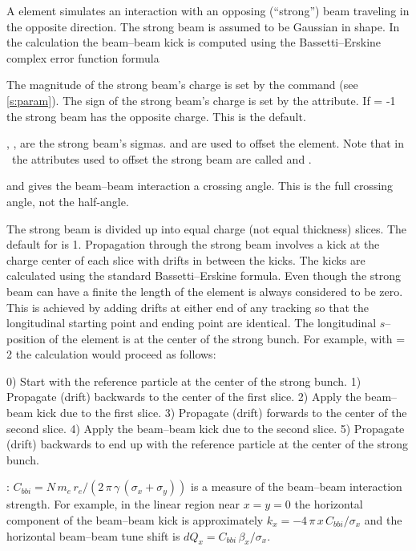 A  element simulates an interaction with an opposing
(``strong'') beam traveling in the opposite direction. The strong beam
is assumed to be Gaussian in shape. In the 
calculation the beam--beam kick is computed using the
Bassetti--Erskine complex error function formula\cite{b:talman}

The magnitude of the strong beam's charge is set by the 
command (see \ref{s:param}).  The sign of the strong beam's charge is
set by the  attribute. If  = -1 the
strong beam has the opposite charge. This is the default.

, ,  are the strong beam's sigmas. 
 and  are used to offset the
 element. Note that in \mad\ the attributes used to
offset the strong beam are called  and .

 and  gives the beam--beam interaction a
crossing angle. This is the full crossing angle, not the half-angle.

The strong beam is divided up into  equal charge (not equal
thickness) slices. The default for  is 1. Propagation
through the strong beam involves a kick at the charge center of each
slice with drifts in between the kicks. The kicks are calculated using
the standard Bassetti--Erskine formula.  Even though the strong beam can
have a finite  the length of the element is always considered
to be zero. This is achieved by adding drifts at either end of any
tracking so that the longitudinal starting point and ending point are
identical. The longitudinal $s$--position of the
 element is at the center of the strong bunch. For example,
with  = 2 the calculation would proceed as follows:
\begin{example}
  0) Start with the reference particle at the center of the strong bunch.
  1) Propagate (drift) backwards to the center of the first slice.
  2) Apply the beam--beam kick due to the first slice.
  3) Propagate (drift) forwards to the center of the second slice.
  4) Apply the beam--beam kick due to the second slice.
  5) Propagate (drift) backwards to end up with the reference particle
     at the center of the strong bunch.
\end{example}

: $ C_{bbi} = 
N \, m_e \, r_e / (2 \, \pi \, \gamma \, (\sigma_x + \sigma_y))$ 
is a measure of the beam--beam interaction strength. For example,
in the linear region near $x = y = 0$ the horizontal component of the
beam--beam kick is approximately 
$k_x = -4\, \pi \, x \, C_{bbi} / \sigma_x$ and the
horizontal beam--beam tune shift is 
$dQ_x = C_{bbi} \, \beta_x / \sigma_x$.

